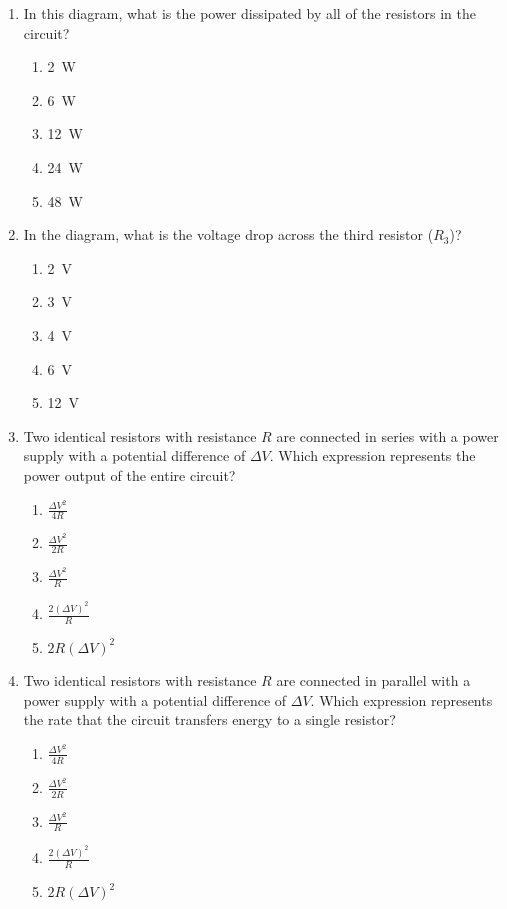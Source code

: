 \documentclass{../../../oss-apphys}
\begin{document}
\begin{multicols*}{2}
\begin{enumerate}[leftmargin=18pt]
  \item In this diagram, what is the power dissipated by all of the resistors in
    the circuit?
    \begin{enumerate}[noitemsep,topsep=0pt,leftmargin=18pt,label=(\Alph*)]  
    \item\SI{2}{W}
    \item\SI{6}{W}
    \item\SI{12}{W}
    \item\SI{24}{W}
    \item\SI{48}{W}
    \end{enumerate}
  
  \item In the diagram, what is the voltage drop across the third resistor
    ($R_3$)?
    \begin{enumerate}[noitemsep,topsep=0pt,leftmargin=18pt,label=(\Alph*)]  
    \item\SI{2}{V}
    \item\SI{3}{V}
    \item\SI{4}{V}
    \item\SI{6}{V}
    \item\SI{12}{V}
    \end{enumerate}
    \label{series4}
    
  \item Two identical resistors with resistance $R$ are connected in series
    with a power supply with a potential difference of $\Delta V$. Which
    expression represents the power output of the entire circuit?
    \begin{enumerate}[noitemsep,topsep=0pt,leftmargin=18pt,label=(\Alph*)]
    \item $\displaystyle\frac{\Delta V^2}{4R}$
    \item $\displaystyle\frac{\Delta V^2}{2R}$
    \item $\displaystyle\frac{\Delta V^2}{R}$
    \item $\displaystyle\frac{2(\Delta V)^2}{R}$
    \item $2R(\Delta V)^2$
    \end{enumerate}

  \item Two identical resistors with resistance $R$ are connected in parallel
    with a power supply with a potential difference of $\Delta V$. Which
    expression represents the rate that the circuit transfers energy to a
    single resistor?
    \begin{enumerate}[noitemsep,topsep=0pt,leftmargin=18pt,label=(\Alph*)]
    \item $\displaystyle\frac{\Delta V^2}{4R}$
    \item $\displaystyle\frac{\Delta V^2}{2R}$
    \item $\displaystyle\frac{\Delta V^2}{R}$
    \item $\displaystyle\frac{2(\Delta V)^2}{R}$
    \item $2R(\Delta V)^2$
    \end{enumerate}
  \end{enumerate}


\end{multicols*}
\end{document}
